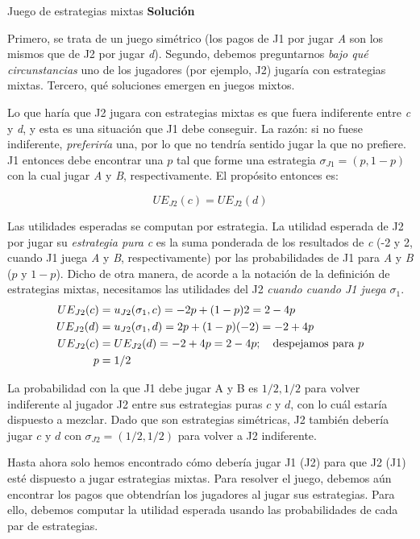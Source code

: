 \documentclass[12pt]{scrartcl}
\theoremstyle{definition}
\begin{document}
\begin{exbox}{Juego de estrategias mixtas}
    \textbf{Solución}
    
    Primero, se trata de un juego simétrico (los pagos de J1 por jugar \textit{A} son los mismos que de J2 por jugar \textit{d}). Segundo, debemos preguntarnos\textit{ bajo qué circunstancias} uno de los jugadores (por ejemplo, J2) jugaría con estrategias mixtas. Tercero, qué soluciones emergen en juegos mixtos.
    
    Lo que haría que J2 jugara con estrategias mixtas es que fuera indiferente entre \textit{c} y \textit{d}, y esta es una situación que J1 debe conseguir. La razón: si no fuese indiferente, \textit{preferiría} una, por lo que no tendría sentido jugar la que no prefiere. J1 entonces debe encontrar una $p$ tal que forme una estrategia $\sigma_{J1} = (p, 1-p)$ con la cual jugar \textit{A} y \textit{B}, respectivamente. El propósito entonces es:
    
    \[ UE_{J2}(c) = UE_{J2}(d) \]
    
    Las utilidades esperadas se computan por estrategia. La utilidad esperada de J2 por jugar su \textit{estrategia pura} \textit{c} es la suma ponderada de los resultados de \textit{c} (-2 y 2, cuando J1 juega \textit{A} y \textit{B}, respectivamente) por las probabilidades de J1 para \textit{A} y \textit{B} ($p$ y $1-p$). Dicho de otra manera, de acorde a la notación de la definición de estrategias mixtas, necesitamos las utilidades del J2 \textit{cuando cuando J1 juega $\sigma_1$}.
    \begin{align*}
    \vspace{-1cm}
        UE_{J2}(c) &= u_{J2}(\sigma_1, c) = -2p + (1-p)2    = 2 -4p\\
        UE_{J2}(d) &= u_{J2}(\sigma_1, d) =  2p  + (1-p)(-2) = -2 + 4p\\
        UE_{J2}(c) &= UE_{J2}(d) = -2 + 4p = 2 -4p;\quad \text{despejamos para } p\\
         p &= 1/2
    \end{align*}
    
    La probabilidad con la que J1 debe jugar A y B es $1/2, 1/2$ para volver indiferente al jugador J2 entre sus estrategias puras $c$ y $d$, con lo cuál estaría dispuesto a mezclar. Dado que son estrategias simétricas, J2 también debería jugar $c$ y $d$ con $\sigma_{J2}=(1/2, 1/2)$ para volver a J2 indiferente. 
\end{exbox}

Hasta ahora solo hemos encontrado cómo debería jugar J1 (J2) para que J2 (J1) esté dispuesto a jugar estrategias mixtas. Para resolver el juego, debemos aún encontrar los pagos que obtendrían los jugadores al jugar sus estrategias. Para ello, debemos computar la utilidad esperada usando las probabilidades de cada par de estrategias. 
\end{document}
